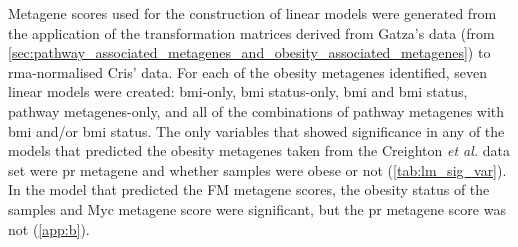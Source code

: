 Metagene scores used for the construction of linear models were generated from the application of the transformation matrices derived from Gatza's data (from \cref{sec:pathway_associated_metagenes_and_obesity_associated_metagenes}) to \gls{rma}-normalised Cris' data.
For each of the obesity metagenes identified, seven linear models were created: \gls{bmi}-only, \gls{bmi} status-only, \gls{bmi} and \gls{bmi} status, pathway metagenes-only, and all of the combinations of pathway metagenes with \gls{bmi} and/or \gls{bmi} status.
The only variables that showed significance in any of the models that predicted the obesity metagenes taken from the Creighton \textit{et al.} data set were \gls{pr} metagene and whether samples were obese or not (\cref{tab:lm_sig_var}).
In the model that predicted the FM metagene scores, the obesity status of the samples and Myc metagene score were significant, but the \gls{pr} metagene score was not (\cref{app:b}).

